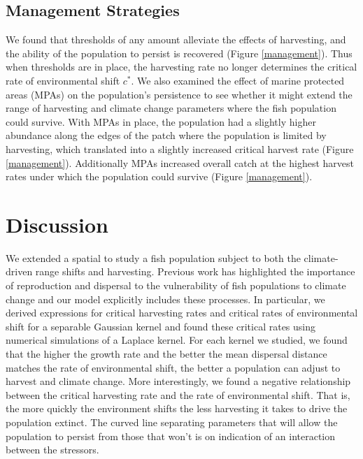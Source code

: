 \documentclass[12pt,english]{article}
\begin{document}
\begin{spacing}{1.9}
\begin{flushleft}
\subsection{Management Strategies }

We found that thresholds of any amount alleviate the effects of harvesting, and the ability of the population to 
persist is recovered (Figure \ref{management}). Thus when thresholds are in place, the harvesting rate no longer 
determines the critical rate of environmental shift $c^*$. We also examined the effect of marine protected 
areas (MPAs) on the population's persistence to see whether it might extend the range of harvesting and 
climate change parameters where the fish population could survive. With MPAs in place, the population had a 
slightly higher abundance along the edges of the patch where the population is limited by harvesting, which 
translated into a slightly increased critical harvest rate (Figure \ref{management}). Additionally MPAs increased 
overall catch at the highest harvest rates under which the population could survive (Figure \ref{management}).

\section{Discussion}

We extended a spatial to study a fish population subject to both the climate-driven range shifts and harvesting. Previous work has highlighted the importance of reproduction and dispersal to the vulnerability of fish populations to climate change \citep[\citet{Fordhametal2013}]{Hastingsetal2005} and our model explicitly includes these processes.  In particular, we derived expressions for critical harvesting rates and critical rates of environmental shift for a separable Gaussian kernel and found these critical rates using numerical simulations of a Laplace kernel.  For each kernel we studied, we found that the higher the growth rate and the better the mean dispersal distance matches the rate of environmental shift, the better a population can adjust to harvest and climate change.  More interestingly, we found a negative relationship between the critical harvesting rate and the rate of environmental shift.  That is, the more quickly the environment shifts the less harvesting it takes to drive the population extinct.  The curved line separating parameters that will allow the population to persist from those that won't is on indication of an interaction between the stressors.


\end{flushleft}
\end{spacing}
\end{document}
